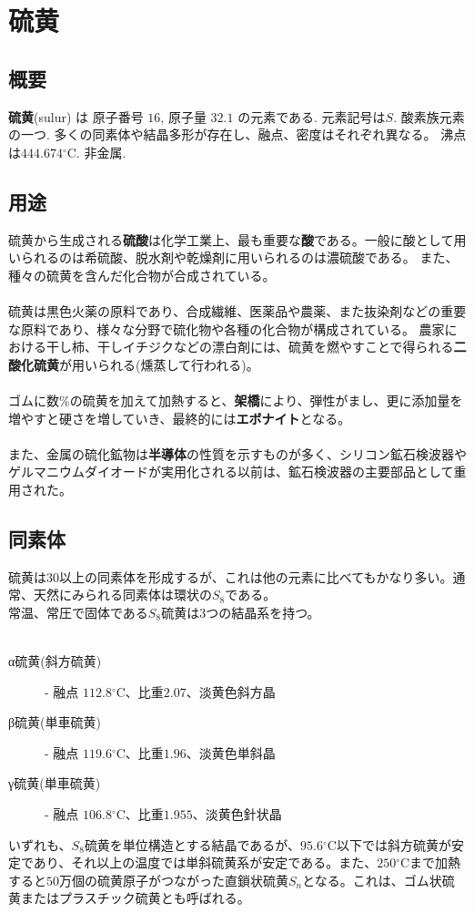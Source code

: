 \chapter{硫黄}

\section{概要}{
	  {\bf 硫黄}(sulur) は 原子番号 $16$, 原子量 $32.1$ の元素である.
	元素記号は$S$. 酸素族元素の一つ. 多くの同素体や結晶多形が存在し、融点、密度はそれぞれ異なる。
	沸点は$444.674 {}^\circ\mathrm{C}$. 非金属.
}

\section{用途}{
	  硫黄から生成される{\bf 硫酸}は化学工業上、最も重要な{\bf 酸}である。一般に酸として用いられるのは希硫酸、脱水剤や乾燥剤に用いられるのは濃硫酸である。
	また、種々の硫黄を含んだ化合物が合成されている。\\
	\\
	硫黄は黒色火薬の原料であり、合成繊維、医薬品や農薬、また抜染剤などの重要な原料であり、様々な分野で硫化物や各種の化合物が構成されている。
	農家における干し柿、干しイチジクなどの漂白剤には、硫黄を燃やすことで得られる{\bf 二酸化硫黄}が用いられる(燻蒸して行われる)。 \\
	\\
	ゴムに数\%の硫黄を加えて加熱すると、{\bf 架橋}により、弾性がまし、更に添加量を増やすと硬さを増していき、最終的には{\bf エボナイト}となる。\\
	\\
	また、金属の硫化鉱物は{\bf 半導体}の性質を示すものが多く、シリコン鉱石検波器やゲルマニウムダイオードが実用化される以前は、鉱石検波器の主要部品として重用された。
}

\section{同素体}{
	硫黄は$30$以上の同素体を形成するが、これは他の元素に比べてもかなり多い。通常、天然にみられる同素体は環状の$S_8$である。\\
	常温、常圧で固体である$S_8$硫黄は3つの結晶系を持つ。\\
	\\
	\begin{description}
		\item[α硫黄(斜方硫黄)] - 融点 $112.8 {}^\circ\mathrm{C}$、比重$2.07$、淡黄色斜方晶
		\item[β硫黄(単車硫黄)] - 融点 $119.6 {}^\circ\mathrm{C}$、比重$1.96$、淡黄色単斜晶
		\item[γ硫黄(単車硫黄)] - 融点 $106.8 {}^\circ\mathrm{C}$、比重$1.955$、淡黄色針状晶
	\end{description}

	いずれも、$S_8$硫黄を単位構造とする結晶であるが、$95.6 {}^\circ\mathrm{C}$以下では斜方硫黄が安定であり、それ以上の温度では単斜硫黄系が安定である。また、$250  {}^\circ\mathrm{C}$まで加熱すると$50$万個の硫黄原子がつながった直鎖状硫黄$S_n$となる。これは、ゴム状硫黄またはプラスチック硫黄とも呼ばれる。
}


